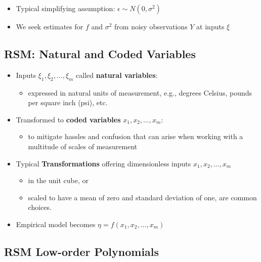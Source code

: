 \documentclass[
  letterpaper,
  DIV=11,
  numbers=noendperiod]{scrreprt}
\providecommand{\tightlist}{%
  \setlength{\itemsep}{0pt}\setlength{\parskip}{0pt}}\usepackage{longtable,booktabs,array}
\begin{document}
\begin{itemize}
\tightlist
\item
  Typical simplifying assumption: \(\epsilon \sim N(0,\sigma^2)\)
\item
  We seek estimates for \(f\) and \(\sigma^2\) from noisy observations
  \(Y\) at inputs \(\xi\)
\end{itemize}

\subsection{RSM: Natural and Coded
Variables}\label{rsm-natural-and-coded-variables}

\begin{itemize}
\tightlist
\item
  Inputs \(\xi_1, \xi_2, \ldots, \xi_m\) called \textbf{natural
  variables}:

  \begin{itemize}
  \tightlist
  \item
    expressed in natural units of measurement, e.g., degrees Celsius,
    pounds per square inch (psi), etc.
  \end{itemize}
\item
  Transformed to \textbf{coded variables} \(x_1, x_2, \ldots, x_m\):

  \begin{itemize}
  \tightlist
  \item
    to mitigate hassles and confusion that can arise when working with a
    multitude of scales of measurement
  \end{itemize}
\item
  Typical \textbf{Transformations} offering dimensionless inputs
  \(x_1, x_2, \ldots, x_m\)

  \begin{itemize}
  \tightlist
  \item
    in the unit cube, or
  \item
    scaled to have a mean of zero and standard deviation of one, are
    common choices.
  \end{itemize}
\item
  Empirical model becomes \(\eta = f(x_1, x_2, \ldots, x_m)\)
\end{itemize}

\subsection{RSM Low-order Polynomials}\label{rsm-low-order-polynomials}
\end{document}

